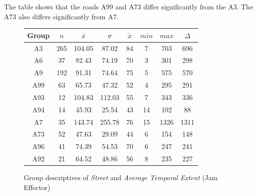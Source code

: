 The table shows that the roads A99 and A73 differ significantly from the A3. The A73 also differs significantly from A7.
\begin{figure}[ht!]
	\centering
	\begin{minipage}{0.5\textwidth}
		\tiny
		\centering
		\begin{tabular}{c|c|c|c|c|c|c|c}
			\toprule
			Group & $n$ & $\bar{x}$ & $\sigma$ & $\tilde{x}$ & $min$ & $max$ & $\Delta$ \\
			\midrule
			A3   & 265 & 104.05 & 87.02  & 84 & 7  & 703  & 696  \\ 
			A6   & 37  & 82.43  & 74.19  & 70 & 3  & 301  & 298  \\ 
			A9   & 192 & 91.31  & 74.64  & 75 & 5  & 575  & 570  \\  
			A99  & 63  & 65.73  & 47.32  & 52 & 4  & 295  & 291  \\ 
			A93  & 12  & 104.83 & 112.03 & 55 & 7  & 343  & 336  \\ 
			A94  & 14  & 45.93  & 25.54  & 43 & 14 & 102  & 88   \\ 
			A7   & 35  & 143.74 & 255.78 & 76 & 15 & 1326 & 1311 \\ 
			A73  & 52  & 47.63  & 29.09  & 44 & 6  & 154  & 148  \\ 
			A96  & 41  & 74.39  & 54.53  & 70 & 6  & 247  & 241  \\ 
			A92  & 21  & 64.52  & 48.86  & 56 & 8  & 235  & 227  \\ 
			\bottomrule
		\end{tabular}
		\label{tbl:descriptives_baysis_effector_Street_TAvg}
	\end{minipage}%
	\begin{minipage}{0.55\textwidth}
		\data
		\pgfplotstablesort[sort key=mean, sort cmp=float >]{\datasorted}{\data}
        \tiny
        \centering
		\label{fig:descriptives_baysis_effector_Street_TAvg}
	\end{minipage}%
	\caption{Group descriptives of \textit{Street} and \textit{Average Temporal Extent} (Jam Effector)}
\end{figure}

